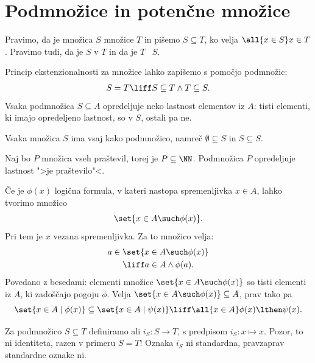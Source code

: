 \chapter{Podmnožice in potenčne množice}

Pravimo, da je množica $S$  množice $T$ in pišemo $S \subseteq T$, ko velja $\all{x \in S} x \in T$. Pravimo tudi, da je $S$  v $T$ in da je $T$ ~$S$.

Princip ekstenzionalnosti za množice lahko zapišemo s pomočjo podmnožic:
%
\begin{equation*}
  S = T \liff S \subseteq T \land T \subseteq S.
\end{equation*}
%
Vsaka podmnožica $S \subseteq A$ opredeljuje neko lastnost elementov iz $A$: tisti
elementi, ki imajo opredeljeno lastnost, so v $S$, ostali pa ne.

Vsaka množica $S$ ima vsaj kako podmnožico, namreč $\emptyset \subseteq S$ in $S \subseteq S$.

\begin{zgled}
  Naj bo $P$ množica vseh praštevil, torej je $P \subseteq \NN$. Podmnožica $P$
  opredeljuje lastnost ">je praštevilo"<.
\end{zgled}


Če je $\phi(x)$ logična formula, v kateri nastopa spremenljivka $x \in A$, lahko tvorimo množico
%
\begin{equation*}
    \set{ x \in A \such \phi(x) }.
\end{equation*}
%
Pri tem je $x$ vezana spremenljivka. Za to množico velja:
%
\begin{multline*}
  a \in \set{ x \in A \such \phi(x) } \\
  \liff a \in A \land \phi(a).
\end{multline*}
%
Povedano z besedami: elementi množice $\set{ x \in A \such \phi(x) }$ so tisti elementi iz $A$, ki zadoščajo pogoju $\phi$.
%
Velja $\set{ x \in A \such \phi(x) } \subseteq A$, prav tako pa
\begin{equation*}
  \set{x \in A \mid \phi(x)} \subseteq \set{x \in A \mid \psi(x)} \liff
  \all{x \in A} \phi(x) \lthen \psi(x).
\end{equation*}

Za podmnožico $S \subseteq T$ definiramo  ali  $i_S : S \to T$, s predpisom $i_S : x \mapsto x$. Pozor, to ni identiteta, razen v primeru $S = T$!
Oznaka $i_S$ ni standardna, pravzaprav standardne oznake ni.

